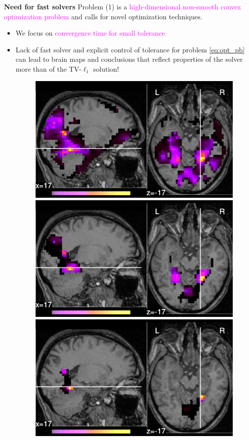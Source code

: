 \documentclass[french]{STIC_poster}
\begin{document}
\begin{frame}[t]
\begin{columns}[t]
\begin{column}{.48\linewidth}
				\begin{nbox}[\textwidth]{\textbf{Need for fast solvers}}
                                  Problem (1) is a \textcolor{magenta}{high-dimensional non-smooth convex optimization problem} and calls for novel optimization techniques. %
                                  \begin{itemize}
                                    \item We focus on \textcolor{magenta}{convergence time for small tolerance}
                                  \item Lack of fast solver and explicit control of
                                    tolerance for problem \eqref{eq:opt_pb} can lead to brain maps and conclusions that reflect
                                    properties of the solver more than of the TV-$\ell_{1}$ solution!
                                  \begin{figure}
                                    \includegraphics[width=.32\linewidth]{maps/face_vs_house_tol_0_1.pdf}%
                                    \hfill%
                                    \includegraphics[width=.32\linewidth]{maps/face_vs_house_tol_0_001.pdf}%
                                    \hfill%
                                    \includegraphics[width=.32\linewidth]{maps/face_vs_house_tol_1e-05.pdf}%

\end{figure}
\end{itemize}
\end{nbox}
\end{column}
\end{columns}
\end{frame}
\end{document}
